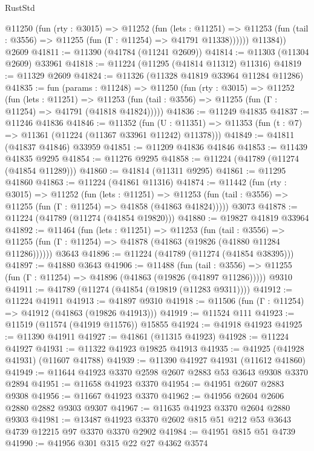 \begin{lexlean}{RustStd}
\begin{coremodule}
          @11250
            (fun (rty : @3015) =>
            @11252
              (fun (lets : @11251) =>
              @11253 (fun (tail : @3556) => @11255 (fun (Γ : @11254) => @41791 @11338))))))
        @11384))
    @2609
@41811 := @11390 (@41784 (@11241 @2609))
@41814 := @11303 (@11304 @2609) @33961
@41818 := @11224 (@11295 (@41814 @11312) @11316)
@41819 := @11329 @2609
@41824 := @11326 (@11328 @41819 @33964 @11284 @11286)
@41835 := fun (params : @11248) =>
  @11250
    (fun (rty : @3015) =>
    @11252
      (fun (lets : @11251) =>
      @11253 (fun (tail : @3556) => @11255 (fun (Γ : @11254) => @41791 (@41818 @41824)))))
@41836 := @11249 @41835
@41837 := @11246 @41836
@41846 := @11352
    (fun (U : @11351) => @11353 (fun (t : @7) => @11361 (@11224 (@11367 @33961 @11242) @11378)))
@41849 := @41811 (@41837 @41846) @33959
@41851 := @11209 @41836 @41846
@41853 := @11439 @41835 @9295
@41854 := @11276 @9295
@41858 := @11224 (@41789 (@11274 (@41854 @11289)))
@41860 := @41814 (@11311 @9295)
@41861 := @11295 @41860
@41863 := @11224 (@41861 @11316)
@41874 := @11442
    (fun (rty : @3015) =>
    @11252
      (fun (lets : @11251) =>
      @11253 (fun (tail : @3556) => @11255 (fun (Γ : @11254) => @41858 (@41863 @41824)))))
    @3073
@41878 := @11224 (@41789 (@11274 (@41854 @19820)))
@41880 := @19827 @41819 @33964
@41892 := @11464
    (fun (lets : @11251) =>
    @11253
      (fun (tail : @3556) =>
      @11255 (fun (Γ : @11254) => @41878 (@41863 (@19826 (@41880 @11284 @11286))))))
    @3643
@41896 := @11224 (@41789 (@11274 (@41854 @38395)))
@41897 := @41880 @3643
@41906 := @11488
    (fun (tail : @3556) => @11255 (fun (Γ : @11254) => @41896 (@41863 (@19826 (@41897 @11286)))))
    @9310
@41911 := @41789 (@11274 (@41854 (@19819 (@11283 @9311))))
@41912 := @11224 @41911
@41913 := @41897 @9310
@41918 := @11506 (fun (Γ : @11254) => @41912 (@41863 (@19826 @41913)))
@41919 := @11524 @111
@41923 := @11519 (@11574 (@41919 @11576)) @15855
@41924 := @41918 @41923
@41925 := @11390 @41911
@41927 := @41861 (@11315 @41923)
@41928 := @11224 @41927
@41931 := @11322 @41923 @19825 @41913
@41935 := @41925 (@41928 @41931) (@11607 @41788)
@41939 := @11390 @41927 @41931 (@11612 @41860)
@41949 := @11644 @41923 @3370 @2598 @2607 @2883 @53 @3643 @9308 @3370 @2894
@41951 := @11658 @41923 @3370
@41954 := @41951 @2607 @2883 @9308
@41956 := @11667 @41923 @3370
@41962 := @41956 @2604 @2606 @2880 @2882 @9303 @9307
@41967 := @11635 @41923 @3370 @2604 @2880 @9303
@41981 := @13487 @41923 @3370 @2602 @815 @51 @212 @53 @3643 @4739 @12215 @97 @3370 @3370 @2902
@41984 := @41951 @815 @51 @4739
@41990 := @41956 @301 @315 @22 @27 @4362 @3574

\end{coremodule}
\end{lexlean}
